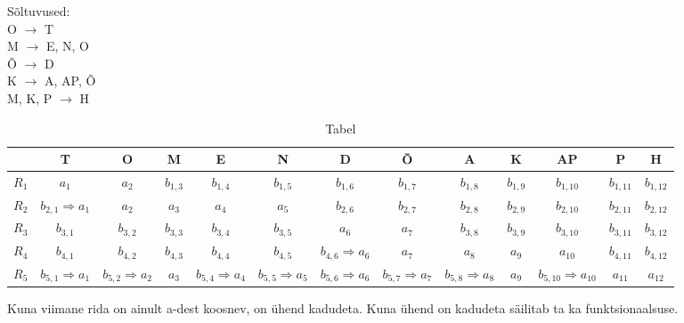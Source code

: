 \documentclass{article}
\begin{document}
S\~oltuvused:\\
O $\rightarrow$ T\\
M $\rightarrow$ E, N, O\\
\~O $\rightarrow$ D\\
K $\rightarrow$ A, AP, \~O\\
M, K, P $\rightarrow$ H

\begin{table}[h!]
  \begin{center}
    \caption{Tabel}
    \begin{tabular}{l|c|c|c|c|c|c|c|c|c|c|c|c}
       &T&O&M&E&N&D&\~O&A&K&AP&P&H\\
      \hline
      $R_1$&$a_1$&$a_2$&$b_{1,3}$&$b_{1,4}$&$b_{1,5}$&$b_{1,6}$&$b_{1,7}$&$b_{1,8}$&$b_{1,9}$&$b_{1,10}$&$b_{1,11}$&$b_{1,12}$\\
      \hline
      $R_2$&$b_{2,1}\Rightarrow a_1$&$a_2$&$a_3$&$a_4$&$a_5$&$b_{2,6}$&$b_{2,7}$&$b_{2,8}$&$b_{2,9}$&$b_{2,10}$&$b_{2,11}$&$b_{2,12}$\\
      \hline
      $R_3$&$b_{3,1}$&$b_{3,2}$&$b_{3,3}$&$b_{3,4}$&$b_{3,5}$&$a_6$&$a_7$&$b_{3,8}$&$b_{3,9}$&$b_{3,10}$&$b_{3,11}$&$b_{3,12}$\\
      \hline
      $R_4$&$b_{4,1}$&$b_{4,2}$&$b_{4,3}$&$b_{4,4}$&$b_{4,5}$&$b_{4,6}\Rightarrow a_6$&$a_7$&$a_8$&$a_9$&$a_{10}$&$b_{4,11}$&$b_{4,12}$\\
      \hline
      $R_5$&$b_{5,1}\Rightarrow a_1$&$b_{5,2}\Rightarrow a_2$&$a_3$&$b_{5,4}\Rightarrow a_4$&$b_{5,5}\Rightarrow a_5$&$b_{5,6}\Rightarrow a_6$&$b_{5,7}\Rightarrow a_7$&$b_{5,8}\Rightarrow a_8$&$a_9$&$b_{5,10}\Rightarrow a_{10}$&$a_{11}$&$a_{12}$\\
    \end{tabular}
  \end{center}
\end{table}
Kuna viimane rida on ainult a-dest koosnev, on \"uhend kadudeta. Kuna \"uhend on kadudeta s\"ailitab ta ka funktsionaalsuse.
\end{document}
